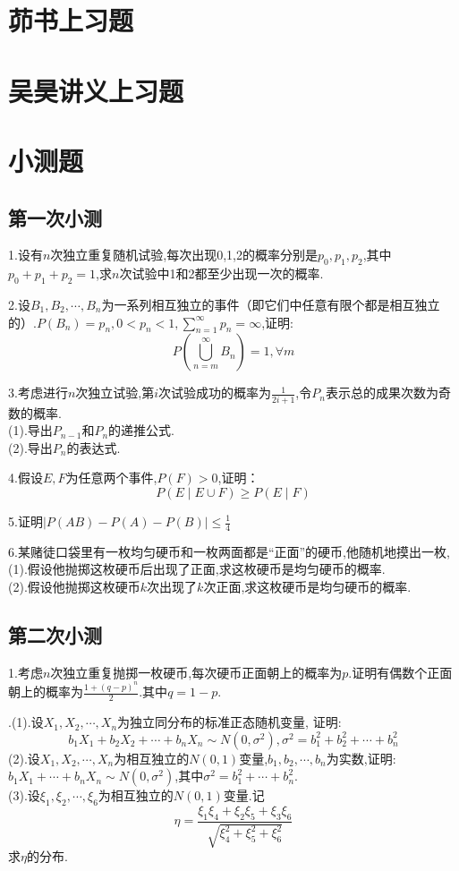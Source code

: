
\chapter{茆书上习题}
\chapter{吴昊讲义上习题}
\chapter{小测题}
\section{第一次小测}
\noindent 1.设有$n$次独立重复随机试验,每次出现0,1,2的概率分别是$p_0,p_1,p_2$,其中$p_0+p_1+p_2=1$,求$n$次试验中1和2都至少出现一次的概率.

\noindent 2.设$B_1,B_2,\cdots,B_n$为一系列相互独立的事件（即它们中任意有限个都是相互独立的）.$P(B_n)=p_n,0<p_n<1,\sum_{n=1}^{\infty}p_n=\infty$,证明:
$$P\left(\bigcup_{n=m}^\infty B_n\right)=1,\forall m$$

\noindent 3.考虑进行$n$次独立试验,第$i$次试验成功的概率为$\frac{1}{2i+1}$,令$P_n$表示总的成果次数为奇数的概率.\\
(1).导出$P_{n-1}$和$P_n$的递推公式.\\
(2).导出$P_n$的表达式.

\noindent 4.假设$E,F$为任意两个事件,$P(F)>0$,证明：
$$P(E\mid E\cup F)\geq P(E\mid F)$$

\noindent 5.证明$\left|P(AB)-P(A)-P(B)\right|\leq\frac{1}{4}$

\noindent 6.某赌徒口袋里有一枚均匀硬币和一枚两面都是“正面”的硬币,他随机地摸出一枚,\\
(1).假设他抛掷这枚硬币后出现了正面,求这枚硬币是均匀硬币的概率.\\
(2).假设他抛掷这枚硬币$k$次出现了$k$次正面,求这枚硬币是均匀硬币的概率.
\newpage
\section{第二次小测}
\noindent 1.考虑$n$次独立重复抛掷一枚硬币,每次硬币正面朝上的概率为$p$.证明有偶数个正面朝上的概率为$\frac{1+(q-p)^n}{2}$.其中$q=1-p$.

.(1).设$X_1,X_2,\cdots,X_n$为独立同分布的标准正态随机变量, 证明:$$b_1X_1+b_2X_2+\cdots+b_nX_n\sim N(0,\sigma^2),\sigma^2=b^2_1+b^2_2+\cdots+b^2_n$$
(2).设$X_1,X_2,\cdots,X_n$为相互独立的$N(0,1)$变量,$b_1,b_2,\cdots,b_n$为实数,证明:$b_1X_1+\cdots+b_nX_n\sim N(0,\sigma^2)$,其中$\sigma^2=b_1^2+\cdots+b_n^2$.\\
(3).设$\xi_1,\xi_2,\cdots,\xi_6$为相互独立的$N(0,1)$变量.记
$$\eta=\frac{\xi_1\xi_4+\xi_2\xi_5+\xi_3\xi_6}{\sqrt{\xi^2_4+\xi_5^2+\xi_6^2}}$$
求$\eta$的分布.

